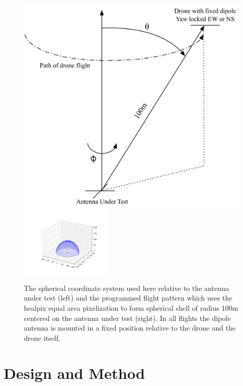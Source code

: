 \documentclass[preprint2,numberedappendix,tighten,twocolappendix]{aastex6}
\begin{document}
\begin{figure}[htb]
\begin{center}
\includegraphics[width=0.6\columnwidth]{figures/ECHO_flight_diagram.png}
\includegraphics[width=0.39\textwidth]{figures/ECHO_flight_path.png}
\caption{The spherical coordinate system used here relative to the antenna under test (left) and the programmed flight pattern which uses the healpix equal area pixelization to form spherical shell of radius 100m centered on the antenna under test (right). In all flights the dipole antenna is mounted in a fixed position relative to the drone and the drone itself. }
\end{center}
\end{figure}

\section{Design and Method}
\label{sec:design}
\end{document}
